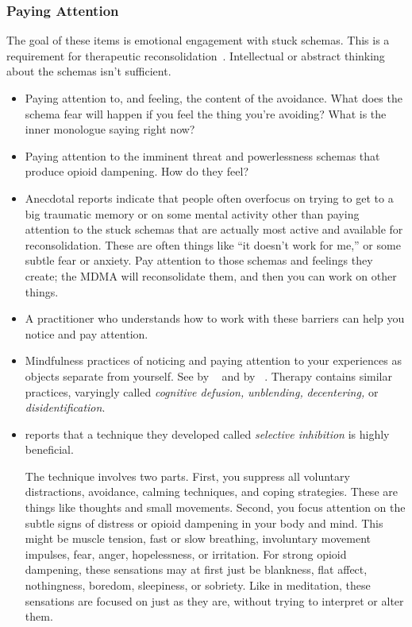\documentclass[11pt,oneside]{book}
\let\cite\parencite
\newcommand{\prosecite}[1]{\citetitle{#1} by \citefullauthor{#1}~\cite{#1}}
\begin{document}
\subsubsection*{Paying Attention}
The goal of these items is emotional engagement with stuck schemas. This is a requirement for therapeutic reconsolidation~\cite{ecker2015misunderstood}. Intellectual or abstract thinking about the schemas isn't sufficient.
\begin{itemize}
    \item Paying attention to, and feeling, the content of the avoidance. What does the schema fear will happen if you feel the thing you're avoiding? What is the inner monologue saying right now?
    \item Paying attention to the imminent threat and powerlessness schemas that produce opioid dampening. How do they feel?
    \item Anecdotal reports indicate that people often overfocus on trying to get to a big traumatic memory or on some mental activity other than paying attention to the stuck schemas that are actually most active and available for reconsolidation. These are often things like \enquote{it doesn't work for me,} or some subtle fear or anxiety. Pay attention to those schemas and feelings they create; the MDMA will reconsolidate them, and then you can work on other things.
    \item A practitioner who understands how to work with these barriers can help you notice and pay attention.
    \item Mindfulness practices of noticing and paying attention to your experiences as objects separate from yourself. See \prosecite{rain} and \prosecite{bodyscan}. Therapy contains similar practices, varyingly called \textit{cognitive defusion,} \textit{unblending,} \textit{decentering,} or \textit{disidentification}.
    \item \textcite{razviPSIP} reports that a technique they developed called \textit{selective inhibition} is highly beneficial.
    
    The technique involves two parts. First, you suppress all voluntary distractions, avoidance, calming techniques, and coping strategies. These are things like thoughts and small movements. Second, you focus attention on the subtle signs of distress or opioid dampening in your body and mind. This might be muscle tension, fast or slow breathing, involuntary movement impulses, fear, anger, hopelessness, or irritation. For strong opioid dampening, these sensations may at first just be blankness, flat affect, nothingness, boredom, sleepiness, or sobriety. Like in meditation, these sensations are focused on just as they are, without trying to interpret or alter them.


\end{itemize}
\end{document}
